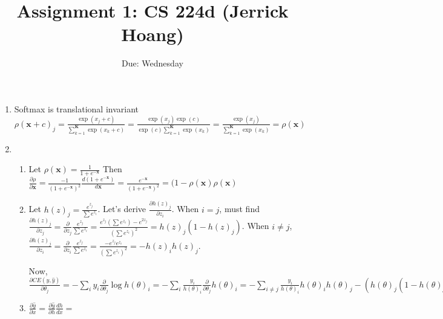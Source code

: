 \documentclass{article}
\title{Assignment 1: CS 224d (Jerrick Hoang)}
\date{Due: Wednesday }
\begin{document}
\maketitle

\begin{enumerate}
\item Softmax is translational invariant
$\rho(\pmb{x} + c)_j = \frac{\exp(x_j + c)}{\sum_{k=1}^{\pmb{K}} \exp(x_k + c)} = \frac{\exp(x_j)\exp(c)}{\exp(c)\sum_{k=1}^{\pmb{K}}\exp(x_k)} = \frac{\exp(x_j)}{\sum_{k=1}^{\pmb{K}}\exp(x_k)} = \rho(\pmb{x})$

\item 
\begin{enumerate}
\item 
Let $\rho(\pmb{x}) = \frac{1}{1 + e^{-\pmb{x}}}$
Then $\frac{\partial \rho}{\partial \pmb{x}} = \frac{-1}{(1+e^{-\pmb{x}})^2} \frac{d (1 + e^{-\pmb{x}})}{d \pmb{x}} = \frac{e^{-\pmb{x}}}{(1 + e^{-\pmb{x}})^2} = (1-\rho(\pmb{x})\rho(\pmb{x})$
\item Let $h(z)_j = \frac{e^{z_j}}{\sum e^{z_i}}$. Let's derive $\frac{\partial h(z)_j}{\partial z_i}$. When $i = j$, must find $\frac{\partial h(z)_j}{\partial z_j} = \frac{\partial}{\partial z_j} \frac{e^{z_j}}{\sum e^{z_i}} = \frac{e^{z_j}(\sum e^{z_i}) - e^{2z_j}}{(\sum e^{z_i})^2} = h(z)_j ( 1 - h(z)_j)$. When $i \neq j$, $\frac{\partial h(z)_j}{\partial z_i} = \frac{\partial}{\partial z_i} \frac{e^{z_j}}{\sum e^{z_i}} = \frac{-e^{z_j}e^{z_i}}{(\sum e^{z_i})^2} = -h(z)_ih(z)_j$. 

Now, $\frac{\partial CE(y, \hat{y})}{\partial \theta_j} = - \sum_i y_i \frac{\partial}{\partial \theta_j} \log h(\theta)_i = - \sum_i \frac{y_i}{h(\theta)_i} \frac{\partial}{\partial \theta_j} h(\theta)_i = - \sum_{i\neq j} \frac{y_i}{h(\theta)_i}h(\theta)_ih(\theta)_j - (h(\theta)_j ( 1 - h(\theta)_j)) = - h(\theta)_j (\sum_{i\neq j} y_i + 1 - h(\theta)_j)$ 

\item $\frac{\partial \hat{y}}{\partial x} = \frac{\partial \hat{y}}{\partial h} \frac{dh}{dx} = $
\end{enumerate}
\end{enumerate}
\end{document}
